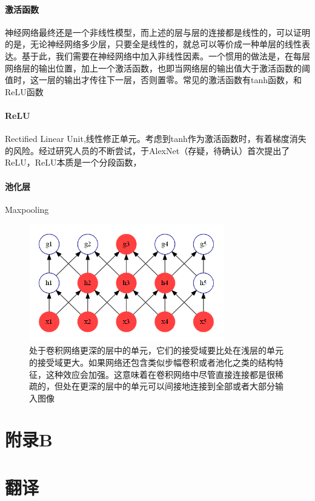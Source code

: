 \documentclass[12pt,a4paper,titlepage]{article}
\begin{document}
\paragraph{激活函数}
神经网络最终还是一个非线性模型，而上述的层与层的连接都是线性的，可以证明的是，无论神经网络多少层，只要全是线性的，就总可以等价成一种单层的线性表达。基于此，我们需要在神经网络中加入非线性因素。一个惯用的做法是，在每层网络层的输出位置，加上一个激活函数，也即当网络层的输出值大于激活函数的阈值时，这一层的输出才传往下一层，否则置零。常见的激活函数有tanh函数，和ReLU函数

\paragraph{ReLU}
Rectified Linear Unit,线性修正单元。考虑到tanh作为激活函数时，有着梯度消失的风险。经过研究人员的不断尝试，于AlexNet（存疑，待确认）首次提出了ReLU，ReLU本质是一个分段函数，

\paragraph{池化层}
Maxpooling



\begin{figure}[htbp]

\centering
\includegraphics[width=8.5cm]{img/deep_receptive_field.png}
\caption{处于卷积网络更深的层中的单元，它们的接受域要比处在浅层的单元的接受域更大。如果网络还包含类似步幅卷积或者池化之类的结构特征，这种效应会加强。这意味着在卷积网络中尽管直接连接都是很稀疏的，但处在更深的层中的单元可以间接地连接到全部或者大部分输入图像}
\label{fig:receptive_field}
\end{figure}

\newpage
\section*{附录B}

\section*{翻译}
\end{document}
